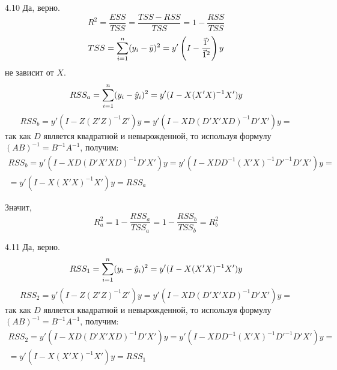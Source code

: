 \protect \hypertarget {soln:4.10}{}
\begin{solution}{{4.10}}
Да, верно.
\[R^2=\frac{ESS}{TSS}=\frac{TSS-RSS}{TSS}=1-\frac{RSS}{TSS}\]
\[TSS=\sum_{i=1}^n(y_i-\bar y)^2=y'\left(I-\frac{\v1'}{\v1^2}\right)y\]
не зависит от $X$.
\[RSS_a=\sum_{i=1}^n(y_i-\hat{y}_i)^2=y'(I-X(X'X)^{-1}X')y\]
\[RSS_b=y'(I-Z(Z'Z)^{-1}Z')y=y'(I-XD(D'X'XD)^{-1}D'X')y=\]
так как $D$ является квадратной и невырожденной, то используя формулу $(AB)^{-1}=B^{-1}A^{-1}$, получим:
\begin{multline*}
RSS_b=y'(I-XD(D'X'XD)^{-1}D'X')y=y'(I-XDD^{-1}(X'X)^{-1}D'^{-1}D'X')y=\\=y'(I-X(X'X)^{-1}X')y=RSS_a
\end{multline*}

Значит,
\[R^2_a=1-\frac{RSS_a}{TSS_a}=1-\frac{RSS_b}{TSS_b}=R^2_b\]
\end{solution}
\protect \hypertarget {soln:4.11}{}
\begin{solution}{{4.11}}
Да, верно.
\[RSS_1=\sum_{i=1}^n(y_i-\hat{y}_i)^2=y'(I-X(X'X)^{-1}X')y\]
\[RSS_2=y'(I-Z(Z'Z)^{-1}Z')y=y'(I-XD(D'X'XD)^{-1}D'X')y=\]
так как $D$ является квадратной и невырожденной, то используя формулу $(AB)^{-1}=B^{-1}A^{-1}$, получим:
\begin{multline*}
RSS_2=y'(I-XD(D'X'XD)^{-1}D'X')y=y'(I-XDD^{-1}(X'X)^{-1}D'^{-1}D'X')y=\\=y'(I-X(X'X)^{-1}X')y=RSS_1
\end{multline*}
\end{solution}
\protect \hypertarget {soln:4.12}{}
